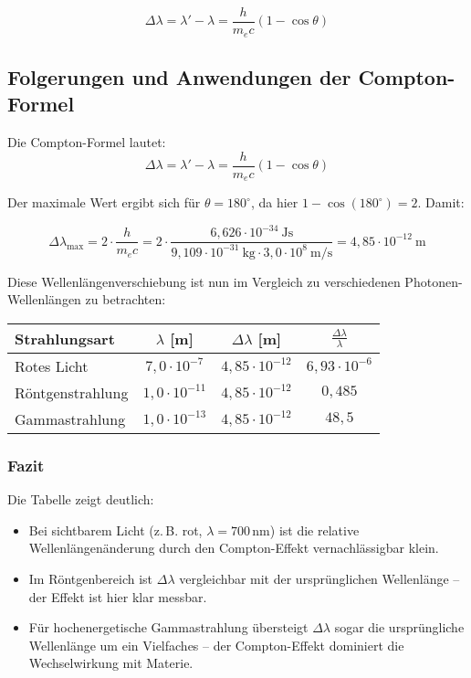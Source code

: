 \[
\boxed{
	\Delta \lambda = \lambda' - \lambda = \frac{h}{m_e c} (1 - \cos\theta)
}
\]




\subsection*{Folgerungen und Anwendungen der Compton-Formel}

Die Compton-Formel lautet:
\[
\Delta \lambda = \lambda' - \lambda = \frac{h}{m_e c}(1 - \cos\theta)
\]

Der maximale Wert ergibt sich für \( \theta = 180^\circ \), da hier \( 1 - \cos(180^\circ) = 2 \). Damit:

\[
\Delta \lambda_\text{max} = 2 \cdot \frac{h}{m_e c}
= 2 \cdot \frac{6{,}626 \cdot 10^{-34}~\text{Js}}{9{,}109 \cdot 10^{-31}~\text{kg} \cdot 3{,}0 \cdot 10^8~\text{m/s}}
= 4{,}85 \cdot 10^{-12}~\text{m}
\]

Diese Wellenlängenverschiebung ist nun im Vergleich zu verschiedenen Photonen-Wellenlängen zu betrachten:

\begin{center}
	\begin{tabular}{|l|c|c|c|}
		\hline
		\textbf{Strahlungsart} & \(\lambda\) [m] & \(\Delta \lambda\) [m] & \(\frac{\Delta \lambda}{\lambda}\) \\
		\hline
		Rotes Licht & \(7{,}0 \cdot 10^{-7}\) & \(4{,}85 \cdot 10^{-12}\) & \(6{,}93 \cdot 10^{-6}\) \\
		Röntgenstrahlung & \(1{,}0 \cdot 10^{-11}\) & \(4{,}85 \cdot 10^{-12}\) & \(0{,}485\) \\
		Gammastrahlung & \(1{,}0 \cdot 10^{-13}\) & \(4{,}85 \cdot 10^{-12}\) & \(48{,}5\) \\
		\hline
	\end{tabular}
\end{center}

\subsubsection*{Fazit}

Die Tabelle zeigt deutlich:

\begin{itemize}
	\item Bei sichtbarem Licht (z.\,B. rot, \( \lambda = 700\,\text{nm} \)) ist die relative Wellenlängenänderung durch den Compton-Effekt vernachlässigbar klein.
	\item Im Röntgenbereich ist \(\Delta \lambda\) vergleichbar mit der ursprünglichen Wellenlänge – der Effekt ist hier klar messbar.
	\item Für hochenergetische Gammastrahlung übersteigt \(\Delta \lambda\) sogar die ursprüngliche Wellenlänge um ein Vielfaches – der Compton-Effekt dominiert die Wechselwirkung mit Materie.
\end{itemize}

